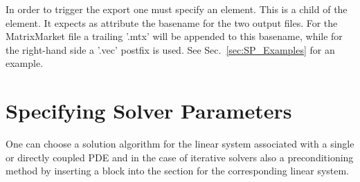 In order to trigger the export one must specify an  element.
This is a child of the  element. It expects as 
attribute the basename for the two output files. For the MatrixMarket file a
trailing '.mtx' will be appended to this basename, while for the right-hand
side a '.vec' postfix is used. See Sec.~\ref{sec:SP_Examples} for an example.
%
%
%
\section{Specifying Solver Parameters}
%
%
One can choose a solution algorithm for the linear system associated with a
single or directly coupled PDE and in the case of iterative solvers also a
preconditioning method by inserting a  block into the 
section for the corresponding linear system.

